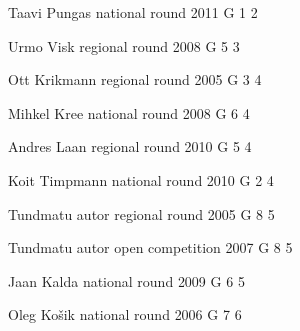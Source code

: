 \documentclass[11pt]{article}
\begin{document}
\ylDisplay{} %
{Taavi Pungas} %
{national round} %
{2011} %
{G 1} %
{2} %
{

\ifEngSolution
\fi
}

\ylDisplay{} %
{Urmo Visk} %
{regional round} %
{2008} %
{G 5} %
{3} %
{

\ifEngSolution
\fi
}

\ylDisplay{} %
{Ott Krikmann} %
{regional round} %
{2005} %
{G 3} %
{4} %
{

\ifEngSolution
\fi
}

\ylDisplay{} %
{Mihkel Kree} %
{national round} %
{2008} %
{G 6} %
{4} %
{

\ifEngSolution
\fi
}

\ylDisplay{} %
{Andres Laan} %
{regional round} %
{2010} %
{G 5} %
{4} %
{

\ifEngSolution
\fi
}

\ylDisplay{} %
{Koit Timpmann} %
{national round} %
{2010} %
{G 2} %
{4} %
{

\ifEngSolution
\fi
}

\ylDisplay{} %
{Tundmatu autor} %
{regional round} %
{2005} %
{G 8} %
{5} %
{

\ifEngSolution
\fi
}

\ylDisplay{} %
{Tundmatu autor} %
{open competition} %
{2007} %
{G 8} %
{5} %
{

\ifEngSolution
\fi
}

\ylDisplay{} %
{Jaan Kalda} %
{national round} %
{2009} %
{G 6} %
{5} %
{

\ifEngSolution
\fi
}

\ylDisplay{} %
{Oleg Košik} %
{national round} %
{2006} %
{G 7} %
{6} %
{

\ifEngSolution
\fi
}
\end{document}
